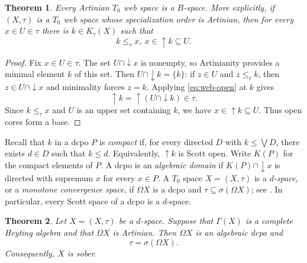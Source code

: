 \documentclass[11pt,reqno]{amsart}
\newtheorem{theorem}{Theorem}[section]
\theoremstyle{definition}
\numberwithin{equation}{section}
\begin{document}
\begin{theorem}\label{thm:artinian-web}
Every Artinian $T_0$ web space is a $B$-space. More explicitly, if
$(X,\tau)$ is a $T_0$ web space whose specialization order is Artinian,
then for every $x\in U\in\tau$ there is $k\in K_\tau(X)$ such that
\begin{equation}\label{eq:artinian-core}
  k\leq_\tau x,~ x\in{\uparrow} k\subseteq U.
\end{equation}
\end{theorem}

\begin{proof}
Fix $x\in U\in\tau$. The set $U\cap{\downarrow} x$ is nonempty, so
Artinianity provides a minimal element $k$ of this set. Then
$U\cap{\downarrow} k=\{k\}$: if $z\in U$ and $z\leq_\tau k$, then
$z\in U\cap{\downarrow} x$ and minimality forces $z=k$.
Applying \eqref{eq:web-open} at $k$ gives
\[
  {\uparrow} k={\uparrow}(U\cap{\downarrow} k)\in\tau.
\]
Since $k\leq_\tau x$ and $U$ is an upper set containing $k$, we have
$x\in{\uparrow} k\subseteq U$. Thus open cores form a base.
\end{proof}

Recall that $k$ in a dcpo $P$ is \emph{compact} if, for every directed
$D$ with $k\leq\bigvee D$, there exists $d\in D$ such that $k\leq d$.
Equivalently, ${\uparrow} k$ is Scott open. Write $K(P)$ for the compact
elements of $P$. A dcpo is an \emph{algebraic domain} if
$K(P)\cap{\downarrow} x$ is directed with supremum $x$ for every $x\in P$.
A $T_0$ space $X=(X,\tau)$ is a \emph{$d$-space}, or a
\emph{monotone convergence space}, if $\Omega X$ is a dcpo and
$\tau\subseteq\sigma(\Omega X)$; see \citet{GierzEtAl2003}.
In particular, every Scott space of a dcpo is a $d$-space.

\begin{theorem}\label{thm:artinian-dspace}
Let $X=(X,\tau)$ be a $d$-space. Suppose that $\Gamma(X)$ is a
complete Heyting algebra and that $\Omega X$ is Artinian. Then
$\Omega X$ is an algebraic dcpo and
\begin{equation}\label{eq:dspace-scott}
  \tau=\sigma(\Omega X).
\end{equation}
Consequently, $X$ is sober.
\end{theorem}
\end{document}

